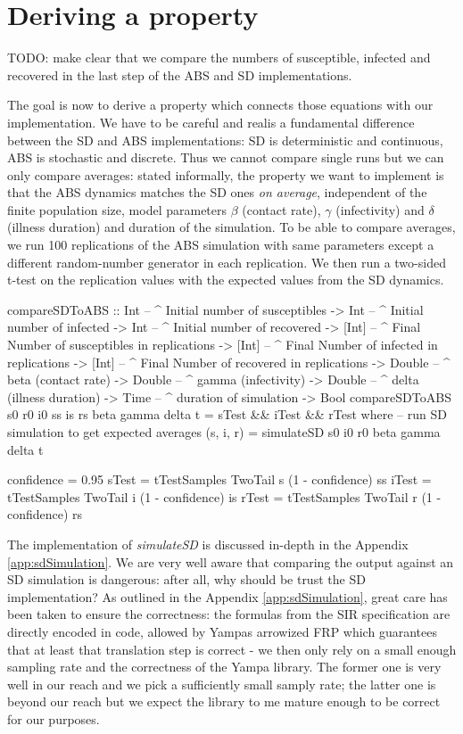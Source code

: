 \section{Deriving a property}
TODO: make clear that we compare the numbers of susceptible, infected and recovered in the last step of the ABS and SD implementations.

The goal is now to derive a property which connects those equations with our implementation. We have to be careful and realis a fundamental difference between the SD and ABS implementations: SD is deterministic and continuous, ABS is stochastic and discrete. Thus we cannot compare single runs but we can only compare averages: stated informally, the property we want to implement is that the ABS dynamics matches the SD ones \textit{on average}, independent of the finite population size, model parameters $\beta$ (contact rate), $\gamma$ (infectivity) and $\delta$ (illness duration) and duration of the simulation. To be able to compare averages, we run 100 replications of the ABS simulation with same parameters except a different random-number generator in each replication. We then run a two-sided t-test on the replication values with the expected values from the SD dynamics.

\begin{HaskellCode}
compareSDToABS :: Int     -- ^ Initial number of susceptibles
               -> Int     -- ^ Initial number of infected
               -> Int     -- ^ Initial number of recovered
               -> [Int]   -- ^ Final Number of susceptibles in replications
               -> [Int]   -- ^ Final Number of infected in replications
               -> [Int]   -- ^ Final Number of recovered in replications
               -> Double  -- ^ beta (contact rate)
               -> Double  -- ^ gamma (infectivity)
               -> Double  -- ^ delta (illness duration)
               -> Time    -- ^ duration of simulation
               -> Bool
compareSDToABS s0 r0 i0
               ss is rs
               beta gamma delta t = sTest && iTest && rTest
  where
    -- run SD simulation to get expected averages
    (s, i, r) = simulateSD s0 i0 r0 beta gamma delta t
    
    confidence = 0.95
    sTest = tTestSamples TwoTail s (1 - confidence) ss
    iTest = tTestSamples TwoTail i (1 - confidence) is
    rTest = tTestSamples TwoTail r (1 - confidence) rs
\end{HaskellCode}

The implementation of \textit{simulateSD} is discussed in-depth in the Appendix \ref{app:sdSimulation}. We are very well aware that comparing the output against an SD simulation is dangerous: after all, why should be trust the SD implementation? As outlined in the Appendix \ref{app:sdSimulation}, great care has been taken to ensure the correctness: the formulas from the SIR specification are directly encoded in code, allowed by Yampas arrowized FRP which guarantees that at least that translation step is correct - we then only rely on a small enough sampling rate and the correctness of the Yampa library. The former one is very well in our reach and we pick a sufficiently small samply rate; the latter one is beyond our reach but we expect the library to me mature enough to be correct for our purposes.

